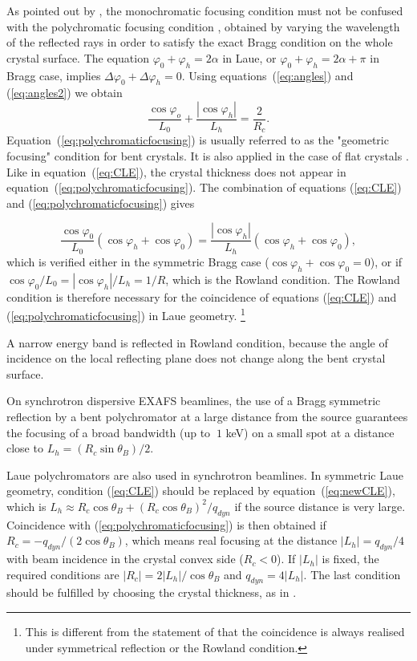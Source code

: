 \documentclass[preprint]{iucr}              %
\begin{document}
As pointed out by \cite{CK}, the monochromatic focusing condition must not be confused with the polychromatic focusing condition \cite{handbook,Caciuffo1987,Schulze1998,Martinson}, obtained by varying the wavelength of the reflected rays in order to satisfy the exact Bragg condition on the whole crystal surface.
The equation $\varphi_0+\varphi_h=2\alpha$ in Laue, or $\varphi_0+\varphi_h=2\alpha+\pi$ in Bragg case, implies $\Delta\varphi_0+\Delta\varphi_h=0$. Using equations~(\ref{eq:angles}) and  (\ref{eq:angles2}) we obtain
\begin{equation}
\label{eq:polychromaticfocusing}
\frac{{\cos {\varphi _o}}}{{{L_0}}} + \frac{{\left| {\cos {\varphi _h}} \right|}}{{{L_h}}} = \frac{2}{R_c}.
\end{equation}
Equation~(\ref{eq:polychromaticfocusing}) is usually referred to as the "geometric focusing" condition for bent crystals. It is also applied in the case of flat crystals \cite{sanchezdelrio1994}. Like in equation~(\ref{eq:CLE}), the crystal thickness does not appear in equation~(\ref{eq:polychromaticfocusing}).
The combination of equations (\ref{eq:CLE}) and (\ref{eq:polychromaticfocusing}) gives

\begin{equation}
\label{eq:coincidence}
\frac{\cos\varphi_0}{L_0}(\cos\varphi_h+\cos\varphi_0) = \frac{|\cos\varphi_h|}{L_h}(\cos\varphi_h+\cos\varphi_0),
\end{equation}
which is verified either in the symmetric Bragg case ($\cos\varphi_h+\cos\varphi_0=0$), or if $\cos\varphi_0/L_0=|\cos\varphi_h|/L_h=1/R$, which is the Rowland condition. The Rowland condition is therefore necessary for the coincidence of equations (\ref{eq:CLE}) and (\ref{eq:polychromaticfocusing}) in Laue geometry.
\footnote{This is different from the statement of \cite{CK} that the coincidence is always realised under symmetrical reflection or the Rowland condition.}

A narrow energy band is reflected in Rowland condition, because the angle of incidence on the local reflecting plane does not change along the bent crystal surface.

On synchrotron dispersive EXAFS beamlines, the use of a Bragg symmetric reflection by a bent polychromator at a large distance from the source guarantees the focusing of a broad bandwidth (up to $~1$ keV) on a small spot \cite{Tolentino:ms0206} at a distance close to $L_h=(R_c\sin\theta_B)/2$. 

Laue polychromators are also used in synchrotron beamlines.
In symmetric Laue geometry, condition (\ref{eq:CLE}) should be replaced by equation~(\ref{eq:newCLE}), which is $L_h \approx R_c \cos\theta_B + (R_c \cos\theta_B) ^2 / q_{dyn}$ if the source distance is very large.
Coincidence with (\ref{eq:polychromaticfocusing}) is then obtained if
$R_c=-q_{dyn}/(2\cos\theta_B)$,
which means real focusing at the distance $|L_h|=q_{dyn}/4$ with beam incidence in the crystal convex side ($R_c<0$). 
If $|L_h|$ is fixed, the required conditions are $|R_c| = 2 |L_h| / \cos\theta_B$ and $q_{dyn}=4|L_h|$. The last condition should be fulfilled by choosing the crystal thickness, as in  \cite{Mocella2004,Mocella2008}.
\end{document}
